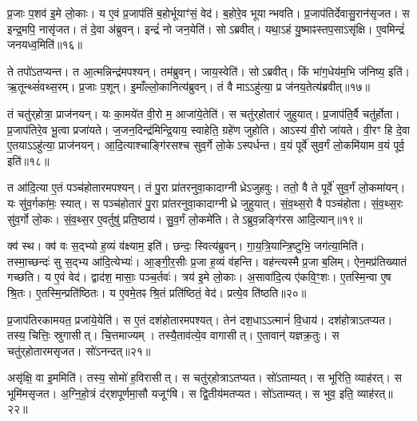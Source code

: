 प्र॒जाः प॒शव॑ इ॒मे लो॒काः।
य ए॒वं प्र॒जाप॑तिं ब॒होर्भूयाꣳ॑सं॒ वेद॑।
ब॒होरे॒व भूयान्भवति।
प्र॒जाप॑तिर्देवासु॒रान॑सृजत।
स इन्द्र॒मपि॒ नासृ॑जत।
तं दे॒वा अ॑ब्रुवन्।
इन्द्रं॑ नो जन॒येति॑।
सोऽब्रवीत्।
यथा॒ऽहं यु॒ष्माꣴस्तप॒सा\-ऽसृ॑क्षि।
ए॒वमिन्द्रं॑ जनयध्व॒मिति॑॥१६॥

ते तपो॑\-ऽतप्यन्त।
त आ॒त्मन्निन्द्र॑मपश्यन्।
तम॑ब्रुवन्।
जाय॒स्वेति॑।
सोऽब्रवीत्।
किं भा॑ग॒धेय॑म॒भि ज॑निष्य॒ इति॑।
ऋ॒तून्थ्सं॑वथ्स॒रम्।
प्र॒जाः प॒शून्।
इ॒माँल्लो॒कानित्य॑ब्रुवन्।
तं वै माऽऽहु॑त्या॒ प्र ज॑नय॒तेत्य॑ब्रवीत्॥१७॥

तं चतु॑र्‌\mbox{}होत्रा॒ प्राज॑नयन्।
यः का॒मये॑त वी॒रो म॒ आजा॑ये॒तेति॑।
स चतु॑र्‌\mbox{}होतारं जुहुयात्।
प्र॒जाप॑ति॒र्वै चतु॑र्\mbox{}होता।
प्र॒जाप॑तिरे॒व भू॒त्वा प्रजा॑यते।
ज॒जन॒दिन्द्र॑मिन्द्रि॒याय॒ स्वाहेति॒ ग्रहे॑ण जुहोति।
आऽस्य॑ वी॒रो जा॑यते।
वी॒रꣳ हि दे॒वा ए॒तया\-ऽऽहु॑त्या॒ प्राज॑नयन्।
आ॒दि॒त्याश्चाङ्गि॑रसश्च सुव॒र्गे लो॒के\-ऽस्पर्धन्त।
व॒यं पूर्वे॑ सुव॒र्गं लो॒कमि॑याम व॒यं पूर्व॒ इति॑॥१८॥

त आ॑दि॒त्या ए॒तं पञ्च॑होतारमपश्यन्।
तं पु॒रा प्रा॑तरनुवा॒कादाग्नीध्रे\-ऽजुहवुः।
ततो॒ वै ते पूर्वे॑ सुव॒र्गं लो॒कमा॑यन्।
यः सु॑व॒र्गका॑मः॒ स्यात्।
स पञ्च॑होतारं पु॒रा प्रा॑तरनुवा॒कादाग्नीध्रे जुहुयात्।
सं॒व॒थ्स॒रो वै पञ्च॑होता।
सं॒व॒थ्स॒रः सु॑व॒र्गो लो॒कः।
सं॒व॒थ्स॒र ए॒वर्तुषु॑ प्रति॒ष्ठाय॑।
सु॒व॒र्गं लो॒कमे॑ति।
तेऽब्रुव॒न्नङ्गि॑रस आदि॒त्यान्॥१९॥

क्व॑ स्थ।
क्व॑ वः स॒द्भ्यो ह॒व्यं व॑क्ष्याम॒ इति॑।
छन्दः॒ स्वित्य॑ब्रुवन्।
गा॒य॒त्रि॒यान्त्रि॒ष्टुभि॒ जग॑त्या॒मिति॑।
तस्मा॒च्छन्दः॑ सु स॒द्भ्य आ॑दि॒त्येभ्यः॑।
आ॒ङ्गी॒र॒सीः प्र॒जा ह॒व्यं व॑हन्ति।
वह॑न्त्यस्मै प्र॒जा ब॒लिम्।
ऐन॒मप्र॑तिख्यातं गच्छति।
य ए॒वं वेद॑।
द्वाद॑श॒ मासाः॒ पञ्च॒र्तवः॑।
त्रय॑ इ॒मे लो॒काः।
अ॒सावा॑दि॒त्य ए॑कवि॒ꣳ॒शः।
ए॒तस्मि॒न्वा ए॒ष श्रि॒तः।
ए॒तस्मि॒न्प्रति॑ष्ठितः।
य ए॒वमे॒तꣴ श्रि॒तं प्रति॑ष्ठितं॒ वेद॑।
प्रत्ये॒व ति॑ष्ठति॥२०॥\anuvakamend[स्या॒दिति॑ संवथ्स॒रो ज॑नयध्व॒मितीत्य॑ब्रवी॒त्पूर्व॒ इत्या॑दि॒त्यानृ॒तवः॒ षट्च॑]

प्र॒जाप॑तिरकामयत॒ प्रजा॑ये॒येति॑।
स ए॒तं दश॑होतारमपश्यत्।
तेन॑ दश॒धा\-ऽऽत्मानं॑ वि॒धाय॑।
दश॑होत्रा\-ऽतप्यत।
तस्य॒ चित्तिः॒ स्रुगासीत्।
चि॒त्तमाज्यम्।
तस्यै॒ताव॑त्ये॒व वागासीत्।
ए॒तावान्॑ यज्ञक्र॒तुः।
स चतु॑र्‌\mbox{}होतारमसृजत।
सो॑ऽनन्दत्॥२१॥

असृ॑क्षि॒ वा इ॒ममिति॑।
तस्य॒ सोमो॑ ह॒विरासीत्।
स चतु॑र्‌\mbox{}होत्रा\-ऽतप्यत।
सो॑ऽताम्यत्।
स भूरिति॒ व्याह॑रत्।
स भूमि॑मसृजत।
अ॒ग्नि॒हो॒त्रं द॑र्‌\mbox{}शपूर्णमा॒सौ यजूꣳ॑षि।
स द्वि॒तीय॑मतप्यत।
सो॑ऽताम्यत्।
स भुव॒ इति॒ व्याह॑रत्॥२२॥

